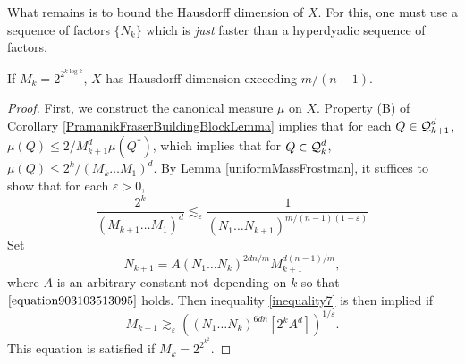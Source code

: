 What remains is to bound the Hausdorff dimension of $X$. For this, one must use a sequence of factors $\{ N_k \}$ which is \emph{just} faster than a hyperdyadic sequence of factors.

\begin{theorem}
    If $M_k = 2^{2^{k \log k}}$, $X$ has Hausdorff dimension exceeding $m/(n-1)$.
\end{theorem}
\begin{proof}
    First, we construct the canonical measure $\mu$ on $X$. Property (B) of Corollary \ref{PramanikFraserBuildingBlockLemma} implies that for each $Q \in \operatorname{\mathcal{Q}}_{k+1}^d$, $\mu(Q) \leq 2/M_{k+1}^d \mu(Q^*)$, which implies that for $Q \in \operatorname{\mathcal{Q}}_k^d$, $\mu(Q) \leq 2^k / (M_k \dots M_1)^d$. By Lemma \ref{uniformMassFrostman}, it suffices to show that for each $\varepsilon > 0$,
    \begin{equation}\label{inequality7} \frac{2^k}{(M_{k+1} \dots M_1)^d} \lesssim_\varepsilon \frac{1}{(N_1 \dots N_{k+1})^{m/(n-1)(1 - \varepsilon)}} \end{equation}
    Set
    \[ N_{k+1} = A (N_1 \dots N_k)^{2dn/m} M_{k+1}^{d(n-1)/m}, \]
    where $A$ is an arbitrary constant not depending on $k$ so that $\eqref{equation903103513095}$ holds. Then inequality \eqref{inequality7} is then implied if
    \[ M_{k+1} \gtrsim_\varepsilon \left( (N_1 \dots N_k)^{6dn} [2^k A^d] \right)^{1/\varepsilon}. \]
    This equation is satisfied if $M_k = 2^{2^{k^2}}$.
\end{proof}

